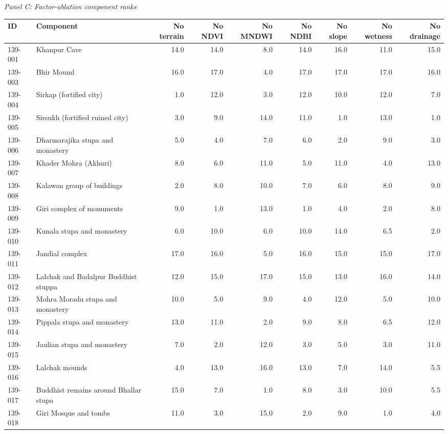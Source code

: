 \begin{landscape}
\begin{center}
\begin{adjustbox}{max width=\linewidth}
\begin{tabular}{p{0.08\textwidth}p{0.25\textwidth}rrrrrrr}
\bottomrule
\end{tabular}
\end{adjustbox}
\end{center}
\endgroup
\par\medskip\noindent\textit{Panel C: Factor-ablation component ranks}\par
\begingroup
\tiny
\setlength{\tabcolsep}{3pt}
\begin{center}
\begin{adjustbox}{max width=\linewidth}
\begin{tabular}{p{}p{}rrrrrrr}
\toprule
ID & Component & No terrain & No NDVI & No MNDWI & No NDBI & No slope & No wetness & No drainage \\
\midrule
139-001 & Khanpur Cave & 14.0 & 14.0 & 8.0 & 14.0 & 16.0 & 11.0 & 15.0 \\
139-003 & Bhir Mound & 16.0 & 17.0 & 4.0 & 17.0 & 17.0 & 17.0 & 16.0 \\
139-004 & Sirkap (fortified city) & 1.0 & 12.0 & 3.0 & 12.0 & 10.0 & 12.0 & 7.0 \\
139-005 & Sirsukh (fortified ruined city) & 3.0 & 9.0 & 14.0 & 11.0 & 1.0 & 13.0 & 1.0 \\
139-006 & Dharmarajika stupa and monastery & 5.0 & 4.0 & 7.0 & 6.0 & 2.0 & 9.0 & 3.0 \\
139-007 & Khader Mohra (Akhuri) & 8.0 & 6.0 & 11.0 & 5.0 & 11.0 & 4.0 & 13.0 \\
139-008 & Kalawan group of buildings & 2.0 & 8.0 & 10.0 & 7.0 & 6.0 & 8.0 & 9.0 \\
139-009 & Giri complex of monuments & 9.0 & 1.0 & 13.0 & 1.0 & 4.0 & 2.0 & 8.0 \\
139-010 & Kunala stupa and monastery & 6.0 & 10.0 & 6.0 & 10.0 & 14.0 & 6.5 & 2.0 \\
139-011 & Jandial complex & 17.0 & 16.0 & 5.0 & 16.0 & 15.0 & 15.0 & 17.0 \\
139-012 & Lalchak and Badalpur Buddhist stuppa & 12.0 & 15.0 & 17.0 & 15.0 & 13.0 & 16.0 & 14.0 \\
139-013 & Mohra Moradu stupa and monastery & 10.0 & 5.0 & 9.0 & 4.0 & 12.0 & 5.0 & 10.0 \\
139-014 & Pippala stupa and monastery & 13.0 & 11.0 & 2.0 & 9.0 & 8.0 & 6.5 & 12.0 \\
139-015 & Jaulian stupa and monastery & 7.0 & 2.0 & 12.0 & 3.0 & 5.0 & 3.0 & 11.0 \\
139-016 & Lalchak mounds & 4.0 & 13.0 & 16.0 & 13.0 & 7.0 & 14.0 & 5.5 \\
139-017 & Buddhist remains around Bhallar stupa & 15.0 & 7.0 & 1.0 & 8.0 & 3.0 & 10.0 & 5.5 \\
139-018 & Giri Mosque and tombs & 11.0 & 3.0 & 15.0 & 2.0 & 9.0 & 1.0 & 4.0 \\
\bottomrule
\end{tabular}
\end{adjustbox}
\end{center}
\endgroup
\end{landscape}
